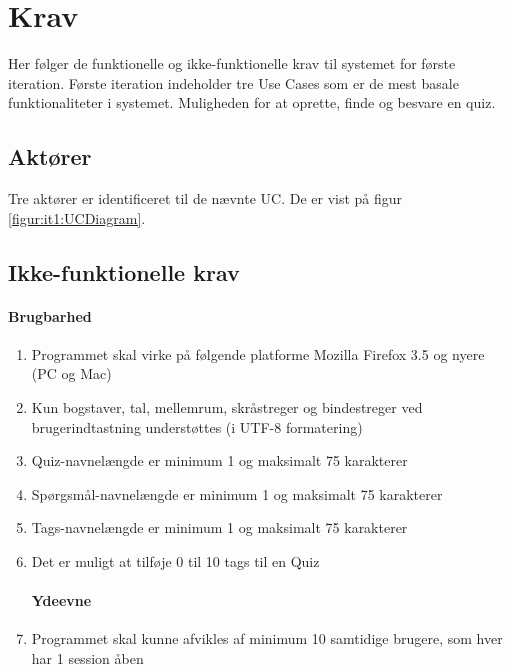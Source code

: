 \chapter{Krav}
Her følger de funktionelle og ikke-funktionelle krav til systemet for første iteration. Første iteration indeholder tre Use Cases som er de mest basale funktionaliteter i systemet. Muligheden for at oprette, finde og besvare en quiz.

\section{Aktører}
Tre aktører er identificeret til de nævnte UC. De er vist på figur \ref{figur:it1:UCDiagram}.


\section*{Ikke-funktionelle krav}
\subsubsection*{Brugbarhed}
\begin{enumerate}
	\item Programmet skal virke på følgende platforme
	\subitem Mozilla Firefox 3.5 og nyere (PC og Mac)
	\item Kun bogstaver, tal, mellemrum, skråstreger og bindestreger ved brugerindtastning
understøttes (i UTF-8 formatering)
	\item Quiz-navnelængde er minimum 1 og maksimalt 75 karakterer
	\item Spørgsmål-navnelængde er minimum 1 og maksimalt 75 karakterer
	\item Tags-navnelængde er minimum 1 og maksimalt 75 karakterer
	\item Det er muligt at tilføje 0 til 10 tags til en Quiz

\subsubsection*{Ydeevne}
	\item Programmet skal kunne afvikles af minimum 10 samtidige brugere, som hver har 1 session åben

\end{enumerate}